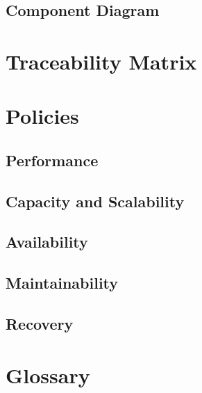 \documentclass[12pt]{article}
\begin{document}
	\subsection {Component Diagram}


	\section{Traceability Matrix}



\lstset{language=Java}

\section{Policies}


	\subsection{Performance}


	
	\subsection{Capacity and Scalability}



	
	\subsection{Availability}


	
	\subsection{Maintainability}



	\subsection{Recovery}



\section{Glossary}
\end{document}
